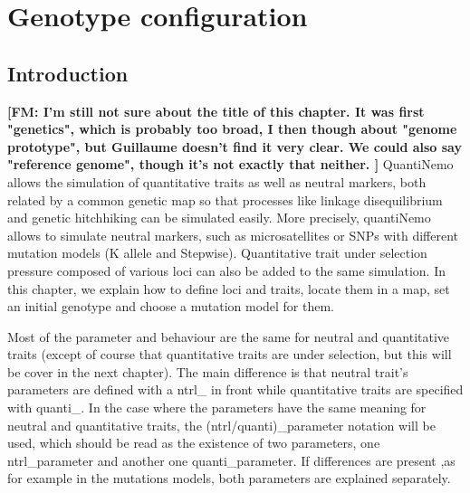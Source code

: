 \documentclass[letterpaper,12pt,oneside]{book}
\newcommand{\fm}[1]{\small {\bf \color{blue} [FM:  #1]} \normalsize}
\begin{document}
\chapter{Genotype configuration}\label{chap:GenotypeConfiguration}
\section{Introduction}
\fm{I'm still not sure about the title of this chapter. It was first "genetics", which is probably too broad, I then though about "genome prototype", but Guillaume doesn't find it very clear. We could also say "reference genome", though it's not exactly that neither. }
QuantiNemo allows the simulation of quantitative traits as well as neutral markers, both related by a common genetic map so that processes like linkage disequilibrium and genetic hitchhiking can be simulated easily. More precisely, quantiNemo allows to simulate neutral markers, such as microsatellites or SNPs with different mutation models (K allele and Stepwise). Quantitative trait under selection pressure composed of various loci can also be added to the same simulation. In this chapter, we explain how to define loci and traits, locate them in a map, set an initial genotype and choose a mutation model for them.

Most of the parameter and behaviour are the same for neutral and quantitative traits (except of course that quantitative traits are under selection, but this will be cover in the next chapter). The main difference is that neutral trait's parameters are defined with a \textsf{ntrl\_} in front while quantitative traits are specified with  \textsf{quanti\_}. In the case where the parameters have the same meaning for neutral and quantitative traits, the \textsf{(ntrl/quanti)\_parameter} notation will be used, which should be read as the existence of two parameters, one \textsf{ntrl\_parameter} and another one \textsf{quanti\_parameter}. If differences are present  ,as for example in the mutations models, both parameters are explained separately. 
\end{document}
